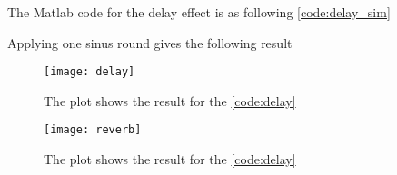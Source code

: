 The Matlab code for the delay effect is as following \autoref{code:delay_sim}

\label{code:delay_sim}


Applying one sinus round gives the following result

\begin{figure}[htbp]
	\centering
	\texttt{[image: delay]}
	\caption{The plot shows the result for the \autoref{code:delay}}
	\label{fig:delay_plot}
\end{figure}



\begin{figure}[htbp]
	\centering
	\texttt{[image: reverb]}
	\caption{The plot shows the result for the \autoref{code:delay}}
	\label{fig:delay_plot}
\end{figure}